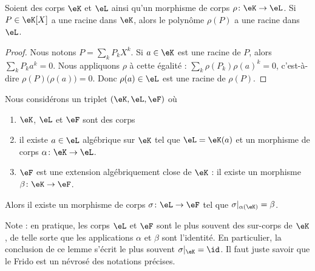 \begin{lemma}
	Soient des corps \( \eK\) et \( \eL\) ainsi qu'un morphisme de corps \( \rho \colon \eK\to \eL\). Si \( P\in \eK[X]\) a une racine dans \( \eK\), alors le polynôme \( \rho(P)\) a une racine dans \( \eL\).
\end{lemma}

\begin{proof}
	Nous notons \( P=\sum_kP_kX^k\). Si \( a\in \eK\) est une racine de \( P\), alors \( \sum_kP_ka^k=0\). Nous appliquons \( \rho\) à cette égalité : \( \sum_k\rho(P_k)\rho(a)^k=0\), c'est-à-dire \( \rho(P)\big( \rho(a) \big)=0\). Donc \( \rho(a)\in \eL\) est une racine de \( \rho(P)\).
\end{proof}

\begin{lemma}     \label{LEMooIIKYooHMNqYn}
	Nous considérons un triplet \( (\eK,\eL,\eF)\) où
	\begin{enumerate}
		\item
		      \( \eK\), \( \eL\) et \( \eF\) sont des corps
		\item
		      il existe \( a\in \eL\) algébrique sur \( \eK\) tel que \( \eL=\eK(a)\) et un morphisme de corps \( \alpha\colon \eK\to \eL\).
		\item
		      \( \eF\) est une extension algébriquement close de \( \eK\) : il existe un morphisme \( \beta\colon \eK\to \eF\).
	\end{enumerate}
	Alors il existe un morphisme de corps \( \sigma\colon \eL\to \eF\) tel que \( \sigma|_{\alpha(\eK)}=\beta\).
\end{lemma}

Note : en pratique, les corps \( \eL\) et \( \eF\) sont le plus souvent des sur-corps de \( \eK\), de telle sorte que les applications \( \alpha\) et \( \beta\) sont l'identité. En particulier, la conclusion de ce lemme s'écrit le plus souvent \( \sigma|_{\eK}=\id\). Il faut juste savoir que le Frido est un névrosé des notations précises.

